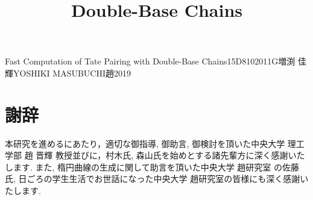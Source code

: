 \documentclass[a4j,oneside,openany]{jsbook}
\begin{document}

\title{Double-Base Chains}{Fast Computation of Tate Pairing with Double-Base Chains}{15D8102011G}{増渕 佳輝}{YOSHIKI MASUBUCHI}{趙}{2019}

\setcounter{page}{1}


\newpage

\tableofcontents
\newpage












\chapter*{謝辞}
本研究を進めるにあたり，適切な御指導, 御助言, 御検討を頂いた中央大学 理工学部 趙 晋輝 教授並びに，村木氏, 森山氏を始めとする諸先輩方に深く感謝いたします. また, 楕円曲線の生成に関して助言を頂いた中央大学 趙研究室 の佐藤氏, 日ごろの学生生活でお世話になった中央大学 趙研究室の皆様にも深く感謝いたします.
\end{document}

